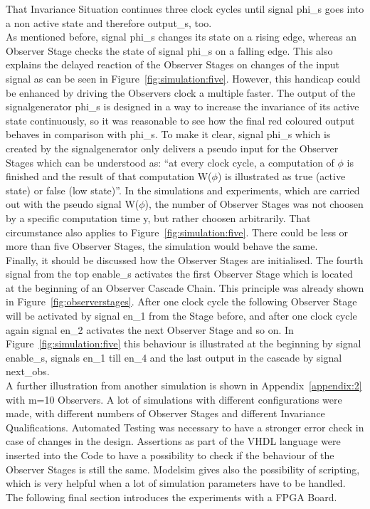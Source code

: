 That Invariance Situation continues three clock cycles until signal phi\_s goes into a non active state and therefore output\_s, too. \\
As mentioned before, signal phi\_s changes its state on a rising edge, whereas an Observer Stage checks the state of signal phi\_s on a falling edge. 
This also explains the delayed reaction of the Observer Stages on changes of the input signal as can be seen in Figure~\ref{fig:simulation:five}. 
However, this handicap could be enhanced by driving the Observers clock a multiple faster. 
The output of the signalgenerator phi\_s is designed in a way to increase the invariance of its active state continuously, 
so it was reasonable to see how the final red coloured output behaves in comparison with phi\_s. 
To make it clear, signal phi\_s which is created by the signalgenerator only delivers a pseudo input for the Observer Stages which can be understood as: 
``at every clock cycle, a computation of $\phi$ is finished and the result of that computation W($\phi$) is illustrated as true (active state) or false (low state)''. 
In the simulations and experiments, which are carried out with the pseudo signal W($\phi$), 
the number of Observer Stages was not choosen by a specific computation time y, but rather choosen arbitrarily.
That circumstance also applies to Figure~\ref{fig:simulation:five}.
There could be less or more than five Observer Stages, the simulation would behave the same. \\  
Finally, it should be discussed how the Observer Stages are initialised. 
The fourth signal from the top enable\_s activates the first Observer Stage which is located at the beginning of an Observer Cascade Chain. 
This principle was already shown in Figure~\ref{fig:observerstages}. 
After one clock cycle the following Observer Stage will be activated by signal en\_1 from the Stage before, and after one clock cycle again signal en\_2 activates the next Observer Stage and so on. 
In Figure~\ref{fig:simulation:five} this behaviour is illustrated at the beginning by signal enable\_s, signals en\_1 till en\_4 and the last output in the cascade by signal next\_obs. \\
A further illustration from another simulation is shown in Appendix~\ref{appendix:2} with m=10 Observers. 
A lot of simulations with different configurations were made, with different numbers of Observer Stages and different Invariance Qualifications. 
Automated Testing was necessary to have a stronger error check in case of changes in the design. 
Assertions as part of the VHDL language were inserted into the Code to have a possibility to check if the behaviour of the Observer Stages is still the same. 
Modelsim gives also the possibility of scripting, which is very helpful when a lot of simulation parameters have to be handled. \\
The following final section introduces the experiments with a FPGA Board. 


